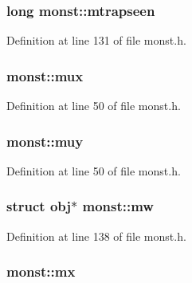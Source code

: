 \hypertarget{structmonst_a792271938bf793d0b6cfef02171f967a}{
\subsubsection[{mtrapseen}]{\setlength{\rightskip}{0pt plus 5cm}long monst\+::mtrapseen}}\label{structmonst_a792271938bf793d0b6cfef02171f967a}


Definition at line 131 of file monst.\+h.

\hypertarget{structmonst_abbf7f123305ee87bce6247f2a168b63d}{
\subsubsection[{mux}]{ monst\+::mux}}\label{structmonst_abbf7f123305ee87bce6247f2a168b63d}


Definition at line 50 of file monst.\+h.

\hypertarget{structmonst_ab4c41d111e70e2301aebf3c12b1404e8}{
\subsubsection[{muy}]{ monst\+::muy}}\label{structmonst_ab4c41d111e70e2301aebf3c12b1404e8}


Definition at line 50 of file monst.\+h.

\hypertarget{structmonst_a7f9a7c88f9e21d79368123c0a72af0d5}{
\subsubsection[{mw}]{\setlength{\rightskip}{0pt plus 5cm}struct {\bf obj}$\ast$ monst\+::mw}}\label{structmonst_a7f9a7c88f9e21d79368123c0a72af0d5}


Definition at line 138 of file monst.\+h.

\hypertarget{structmonst_a9bc20171e986845daccff8aafd8b5194}{
\subsubsection[{mx}]{ monst\+::mx}}\label{structmonst_a9bc20171e986845daccff8aafd8b5194}


